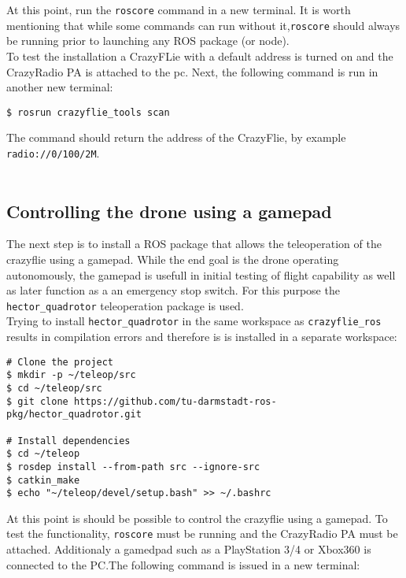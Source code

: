 \noindent At this point, run the \texttt{roscore} command in a new terminal. It is worth mentioning that while some commands can run without it,\texttt{roscore} should always be running prior to launching any ROS package (or node).\\
To test the installation a CrazyFLie with a default address is turned on and the CrazyRadio PA is attached to the pc. Next, the following command is run in another new terminal:

\begin{mdframed}[backgroundcolor=light-gray, linecolor=light-gray]
\begin{verbatim}
$ rosrun crazyflie_tools scan
\end{verbatim}
\end{mdframed}

\noindent The command should return the address of the CrazyFlie, by example \texttt{radio://0/100/2M}.\\\\

\subsection{Controlling the drone using a gamepad}

The next step is to install a ROS package that allows the teleoperation of the crazyflie using a gamepad. While the end goal is the drone operating autonomously, the gamepad is usefull in initial testing of flight capability as well as later function as a an emergency stop switch. For this purpose the \texttt{hector\_quadrotor} teleoperation package is used.\\
Trying to install  \texttt{hector\_quadrotor} in the same workspace as \texttt{crazyflie\_ros} results in compilation errors and therefore is is installed in a separate workspace:

\begin{mdframed}[backgroundcolor=light-gray, linecolor=light-gray]
\begin{verbatim}
# Clone the project
$ mkdir -p ~/teleop/src
$ cd ~/teleop/src
$ git clone https://github.com/tu-darmstadt-ros-pkg/hector_quadrotor.git

# Install dependencies
$ cd ~/teleop
$ rosdep install --from-path src --ignore-src
$ catkin_make
$ echo "~/teleop/devel/setup.bash" >> ~/.bashrc 
\end{verbatim}
\end{mdframed}

\noindent At this point is should be possible to control the crazyflie using a gamepad. To test the functionality, \texttt{roscore} must be running and the CrazyRadio PA must be attached. Additionaly a gamedpad such as a PlayStation 3/4 or Xbox360 is connected to the PC.The following command is issued in a new terminal:

